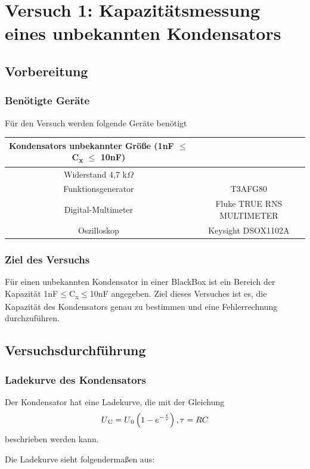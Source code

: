 \chapter{Versuch 1: Kapazitätsmessung eines unbekannten Kondensators}

\section{Vorbereitung}
\subsection{Benötigte Geräte}

Für den Versuch werden folgende Geräte benötigt

\begin{tabular}[h]{c|c}
    Kondensators unbekannter Größe (1nF $\le$ C\textsubscript{x} $\le$ 10nF) \\
    \hline
    Widerstand 4,7 k$\Omega$& \\
    \hline
    Funktionsgenerator & T3AFG80\\
    \hline
    Digital-Multimeter & Fluke TRUE RNS MULTIMETER\\
    \hline
    Oszilloskop & Keysight DSOX1102A
    \label{tab:Versuch 1: Geräte}
\end{tabular}

\subsection{Ziel des Versuchs}
Für einen unbekannten Kondensator in einer BlackBox ist ein Bereich der Kapazität
1nF$\le$C\textsubscript{x}$\le$10nF angegeben. Ziel dieses Versuches ist es, 
die Kapazität des Kondensators genau zu bestimmen und eine Fehlerrechnung durchzuführen.



\section{Versuchsdurchführung}


\subsection{Ladekurve des Kondensators}
Der Kondensator hat eine Ladekurve, die mit der Gleichung 
\[U\textsubscript{C} = U\textsubscript{0} \left(1 - e^{-\frac{t}{\tau}}\right), \tau=RC\]
beschrieben werden kann.\par
Die Ladekurve sieht folgendermaßen aus: 

